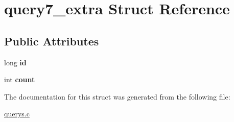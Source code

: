 \hypertarget{structquery7__extra}{}\section{query7\+\_\+extra Struct Reference}
\label{structquery7__extra}
\subsection*{Public Attributes}
\begin{DoxyCompactItemize}
\item 
long {\bfseries id}\hypertarget{structquery7__extra_ab84eef67c89138472740808e60b6e522}{}\label{structquery7__extra_ab84eef67c89138472740808e60b6e522}

\item 
int {\bfseries count}\hypertarget{structquery7__extra_a6151a4bf8da970a41fda59de99ddd32c}{}\label{structquery7__extra_a6151a4bf8da970a41fda59de99ddd32c}

\end{DoxyCompactItemize}


The documentation for this struct was generated from the following file\+:\begin{DoxyCompactItemize}
\item 
\hyperlink{querys_8c}{querys.\+c}\end{DoxyCompactItemize}
